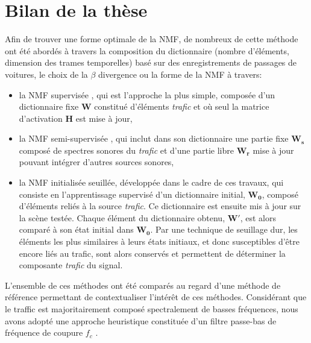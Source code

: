 \section*{Bilan de la thèse}
Afin de trouver une forme optimale de la NMF, de nombreux  de cette méthode ont été abordés  à travers la composition du dictionnaire (nombre d'éléments, dimension des trames temporelles) basé sur des enregistrements de passages de voitures, le choix de la $\beta$ divergence ou la forme de la NMF à travers:
\begin{itemize}
\item la NMF supervisée \cite{lee_learning_1999,fevotte_algorithms_2011}, qui est l'approche la plus simple, composée d'un dictionnaire fixe $ \mathbf{W}$ constitué d'éléments \textit{trafic} et où seul la matrice d'activation $\mathbf{H}$ est mise à jour,
\item la NMF semi-supervisée \cite{lee_semi-supervised_2010,kitamura2014music}, qui inclut dans son  dictionnaire une partie fixe $\mathbf{W_s}$ composé de spectres sonores du \textit{trafic} et d'une partie libre $\mathbf{W_r}$ mise à jour pouvant intégrer d'autres sources sonores,
\item la NMF initialisée seuillée, développée dans le cadre de ces travaux, qui consiste en l'apprentissage supervisé d'un dictionnaire initial, $\mathbf{W_0}$, composé d'éléments reliés à la source \textit{trafic}. Ce dictionnaire est ensuite mis à jour sur la scène testée. Chaque élément du dictionnaire obtenu, $\mathbf{W'}$, est alors comparé à son état initial dans $\mathbf{W_0}$. Par une technique de seuillage dur, les éléments les plus similaires à leurs états initiaux, et donc susceptibles d'être encore liés au trafic, sont alors conservés et permettent de déterminer la composante \textit{trafic} du signal.
\end{itemize}

L'ensemble de ces méthodes ont été comparés au regard d'une méthode de référence permettant de contextualiser l'intérêt de ces méthodes. Considérant que le traffic est majoritairement composé spectralement de basses fréquences, nous avons adopté une approche heuristique constituée d'un filtre passe-bas de fréquence de coupure $f_c$ . %

